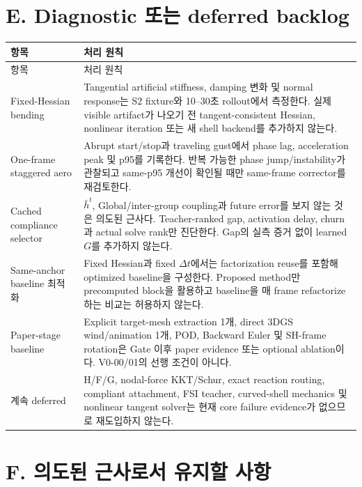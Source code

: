 \documentclass[11pt]{article}
\begin{document}
\section{E. Diagnostic 또는 deferred backlog}

\begin{longtable}{L{0.24\textwidth}L{0.66\textwidth}}
\toprule
항목 & 처리 원칙 \\
\midrule
\endfirsthead
\toprule
항목 & 처리 원칙 \\
\midrule
\endhead
Fixed-Hessian bending & Tangential artificial stiffness, damping 변화 및 normal response는 S2 fixture와 10--30초 rollout에서 측정한다. 실제 visible artifact가 나오기 전 tangent-consistent Hessian, nonlinear iteration 또는 새 shell backend를 추가하지 않는다. \\
One-frame staggered aero & Abrupt start/stop과 traveling gust에서 phase lag, acceleration peak 및 p95를 기록한다. 반복 가능한 phase jump/instability가 관찰되고 same-p95 개선이 확인될 때만 same-frame corrector를 재검토한다. \\
Cached compliance selector & $\bar h^t$, Global/inter-group coupling과 future error를 보지 않는 것은 의도된 근사다. Teacher-ranked gap, activation delay, churn과 actual solve rank만 진단한다. Gap의 실측 증거 없이 learned $G$를 추가하지 않는다. \\
Same-anchor baseline 최적화 & Fixed Hessian과 fixed $\Delta t$에서는 factorization reuse를 포함해 optimized baseline을 구성한다. Proposed method만 precomputed block을 활용하고 baseline을 매 frame refactorize하는 비교는 허용하지 않는다. \\
Paper-stage baseline & Explicit target-mesh extraction 1개, direct 3DGS wind/animation 1개, POD, Backward Euler 및 SH-frame rotation은 Gate 이후 paper evidence 또는 optional ablation이다. V0-00/01의 선행 조건이 아니다. \\
계속 deferred & H/F/G, nodal-force KKT/Schur, exact reaction routing, compliant attachment, FSI teacher, curved-shell mechanics 및 nonlinear tangent solver는 현재 core failure evidence가 없으므로 재도입하지 않는다. \\
\bottomrule
\end{longtable}

\section{F. 의도된 근사로서 유지할 사항}
\end{document}
